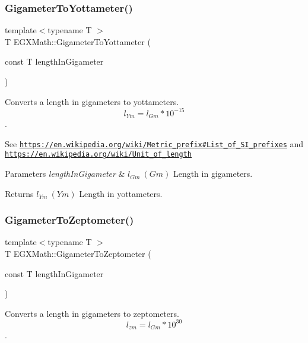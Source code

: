 \subsubsection{\texorpdfstring{Gigameter\+To\+Yottameter()}{GigameterToYottameter()}}
{\footnotesize\ttfamily template$<$typename T $>$ \\
T E\+G\+X\+Math\+::\+Gigameter\+To\+Yottameter (\begin{DoxyParamCaption}\item[{const T}]{length\+In\+Gigameter }\end{DoxyParamCaption})}



Converts a length in gigameters to yottameters. \[ l_{Ym}=l_{Gm} * 10^{-15} \]. 

See \href{https://en.wikipedia.org/wiki/Metric_prefix#List_of_SI_prefixes}{\tt https\+://en.\+wikipedia.\+org/wiki/\+Metric\+\_\+prefix\#\+List\+\_\+of\+\_\+\+S\+I\+\_\+prefixes} and \href{https://en.wikipedia.org/wiki/Unit_of_length}{\tt https\+://en.\+wikipedia.\+org/wiki/\+Unit\+\_\+of\+\_\+length} 
\begin{DoxyParams}{Parameters}
{\em length\+In\+Gigameter} & $ l_{Gm}\ (Gm)$ Length in gigameters. \\
\hline
\end{DoxyParams}
\begin{DoxyReturn}{Returns}
$ l_{Ym}\ (Ym)$ Length in yottameters. 
\end{DoxyReturn}
\mbox{\label{group___e_g_x_math-_conversions-_length_conversions-_s_i-_gigameter-_s_i_ga5013069156df55018bc5a7f57f236f08}} 
\subsubsection{\texorpdfstring{Gigameter\+To\+Zeptometer()}{GigameterToZeptometer()}}
{\footnotesize\ttfamily template$<$typename T $>$ \\
T E\+G\+X\+Math\+::\+Gigameter\+To\+Zeptometer (\begin{DoxyParamCaption}\item[{const T}]{length\+In\+Gigameter }\end{DoxyParamCaption})}



Converts a length in gigameters to zeptometers. \[ l_{zm}=l_{Gm} * 10^{30} \]. 

